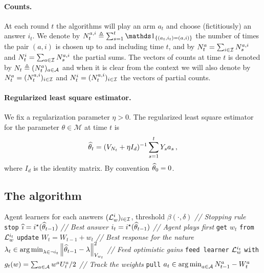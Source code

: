 \paragraph{Counts.} At each round $t$ the algorithms will play an arm $a_t$ and choose (fictitiously) an answer $i_t$. We denote by $N_t^{a,i} \eqdef\sum_{s=1}^t \ind_{\{(a_t,i_t)=(a,i)\}}$ the number of times the pair $(a,i)$ is chosen up to and including time $t$, and by $N_t^a =\sum_{i\in\mathcal{I}} N_s^{a,i}$ and $N_t^i =\sum_{a\in\mathcal{I}} N_s^{a,i}$ the partial sums. The vectors of counts at time $t$ is denoted by $N_t \triangleq (N_t^a)_{a\in\mathcal{A}}$
and when it is clear from the context we will also denote by $N_t^a = (N_t^{a,i})_{i\in\mathcal{I}}$ and $N_t^i = (N_t^{a,i})_{i\in\mathcal{I}}$ the vectors of partial counts.

\paragraph{Regularized least square estimator.} We fix a regularization parameter $\eta > 0$. The regularized least square estimator for the parameter $\theta\in \mathcal M$ at time $t$ is
\[
\widehat{\theta}_{t} = (V_{N_t} + \eta I_d)^{-1} \sum_{s=1}^t Y_s a_s\,,
\]
where $I_d$ is the identity matrix. By convention $\widehat{\theta}_0 = 0$.


\subsection{The \LG{} algorithm}

\begin{algorithm}[ht]
\centering
\caption{\LG}
\label{alg:lg}
\begin{algorithmic}[1]
     Agent learners for each answers $(\mathcal{L}^i_w)_{i\in\mathcal{I}}$, threshold $\beta(\cdot,\delta)$
        \State \textit{// Stopping rule}
            \State \texttt{stop} 
             $\widehat{\imath} = i^\star(\widehat{\theta}_{t-1})$
        \EndIf
        \State \textit{// Best answer}
        \State $i_{t} = i^\star(\widehat{\theta}_{t-1})$
        \State \textit{// Agent plays first}
        \State \texttt{get} $w_{t}$ \texttt{from} $\mathcal{L}^{i_t}_w$
        \State \texttt{update} $W_{t}=W_{t-1}+w_{t}$
        \State \textit{// Best response for the nature}
        \State $\lambda_{t} \in \operatorname*{arg\,min}_{\lambda\in\neg i_t}\left\lVert\widehat{\theta}_{t-1}-\lambda\right\rVert^2_{V_{w_{t}}}$
        \State \textit{// Feed optimistic gains}
        \State \texttt{feed learner} $\mathcal{L}_w^{i_{t}}$ \texttt{with} $g_{t}(w) = \sum_{a\in\mathcal{A}}w^a U_t^a/2$
        \State \textit{// Track the weights}
        \State \texttt{pull} $a_{t}\in \operatorname*{arg\,min}_{a\in \mathcal A } N_{t-1}^{a} - W_{t}^{a}$
   \EndFor
\end{algorithmic}
\end{algorithm}

